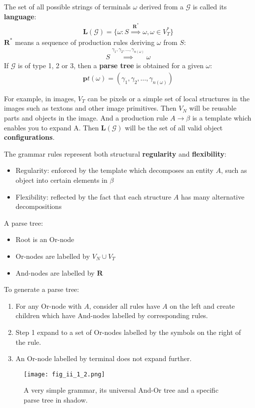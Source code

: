 \documentclass[../Notes_of_CaRiVaC.tex]{subfiles}
\begin{document}
The set of all possible strings of terminals $\omega$ derived from a
$\mathcal{G}$ is called its \textbf{language}:
%
\begin{align}
  \label{eq:ii.1.3}
  \mathbf{L}(\mathcal{G}) = \{\omega: S \overset{\mathbf{R^*}}{\implies} \omega, \omega \in V^*_T\}
\end{align}
%
$\mathbf{R^*}$ means a sequence of production rules deriving $\omega$ from $S$:
%
\begin{align}
  \label{eq:ii.1.4}
  S \overset{\gamma_1, \gamma_2, \ldots, \gamma_{n(\omega)}}{\implies} \omega
\end{align}
%
If $\mathcal{G}$ is of type 1, 2 or 3, then a \textbf{parse tree} is obtained
for a given $\omega$:
%
\begin{align}
  \label{eq:ii.1.5}
  \mathbf{p}t(\omega) = (\gamma_1, \gamma_2, \ldots, \gamma_{n(\omega)})
\end{align}
%

For example, in images, $V_T$ can be pixels or a simple set of local structures
in the images such as textons and other image primitives. Then $V_N$ will be
reusable parts and objects in the image. And a production rule
$A \to \beta$ is a template which enables you to expand A. Then
$\mathbf{L}(\mathcal{G})$ will be the set of all valid object
\textbf{configurations}.

The grammar rules represent both structural \textbf{regularity} and
\textbf{flexibility}:
%
\begin{itemize}
  \item Regularity: enforced by the template which decomposes an entity $A$,
    such as object into certain elements in $\beta$
  \item Flexibility: reflected by the fact that each structure $A$ has many
    alternative decompositions
\end{itemize}
%

A parse tree:
%
\begin{itemize}
  \item Root is an Or-node
  \item Or-nodes are labelled by $V_N \cup V_T$
  \item And-nodes are labelled by $\mathbf{R}$
\end{itemize}
%
To generate a parse tree:
%
\begin{enumerate}
  \item For any Or-node with $A$, consider all rules have $A$ on the left and
    create children which have And-nodes labelled by corresponding rules.
  \item Step 1 expand to a set of Or-nodes labelled by the symbols on the right
    of the rule.
  \item An Or-node labelled by terminal does not expand further.
\end{enumerate}
%
\begin{figure}[!htpb]
  \centering
  \texttt{[image: fig\_ii\_1\_2.png]}
  \caption{A very simple grammar, its universal And-Or tree and a specific
    parse tree in shadow.}%
  \label{fig:ii.1.2}
\end{figure}
%
\end{document}

